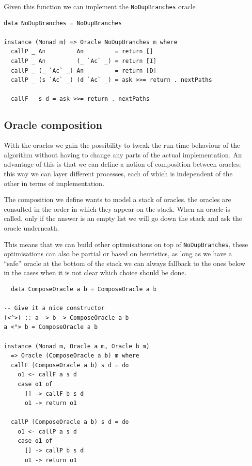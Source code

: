 \documentclass[11pt, titlepage]{article}
\begin{document}
Given this function we can implement the \texttt{NoDupBranches} oracle

\begin{verbatim}
data NoDupBranches = NoDupBranches

instance (Monad m) => Oracle NoDupBranches m where
  callP _ An         An         = return []
  callP _ An         (_ `Ac` _) = return [I]
  callP _ (_ `Ac` _) An         = return [D]
  callP _ (s `Ac` _) (d `Ac` _) = ask >>= return . nextPaths

  callF _ s d = ask >>= return . nextPaths
\end{verbatim}

\subsection{Oracle composition}

With the oracles we gain the possibility to tweak the run-time behaviour of the 
algorithm without having to change any parts of the actual implementation.
An advantage of this is that we can define a notion of 
composition between oracles; this way we can layer different processes, each of 
which is independent of the other in terms of implementation.

The composition we define wants to model a stack of oracles, the oracles are consulted in the order in which they appear on the stack. When an oracle is called, only if the answer is an empty list we will go down the stack and ask the oracle underneath. 

This means that we can build other optimisations on top of \texttt{NoDupBranches}, these optimisations can also be partial or based on heuristics, as long as we have a ``safe'' oracle at the bottom of the stack we can always fallback to the ones below in the cases when it is not clear which choice should be done.

\begin{verbatim}
  data ComposeOracle a b = ComposeOracle a b

-- Give it a nice constructor
(<°>) :: a -> b -> ComposeOracle a b
a <°> b = ComposeOracle a b

instance (Monad m, Oracle a m, Oracle b m) 
  => Oracle (ComposeOracle a b) m where
  callF (ComposeOracle a b) s d = do
    o1 <- callF a s d
    case o1 of
      [] -> callF b s d
      o1 -> return o1

  callP (ComposeOracle a b) s d = do
    o1 <- callP a s d
    case o1 of
      [] -> callP b s d
      o1 -> return o1
\end{verbatim}
\end{document}

